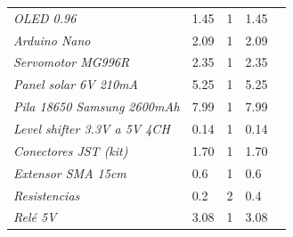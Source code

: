 \documentclass[12pt]{article}
\begin{document}
\begin{table}[h!]
\begin{tabular}{l|l|l|l|l}
			\multicolumn{1}{|l|}{\textit{OLED 0.96}}                        & 1.45                                                 & 1                                      & 1.45                                            &  \\ \cline{1-4}
			\multicolumn{1}{|l|}{\textit{Arduino Nano}}                     & 2.09                                                 & 1                                      & 2.09                                            &  \\ \cline{1-4}
			\multicolumn{1}{|l|}{\textit{Servomotor MG996R}}                & 2.35                                                 & 1                                      & 2.35                                            &  \\ \cline{1-4}
			\multicolumn{1}{|l|}{\textit{Panel solar 6V 210mA}}             & 5.25                                                 & 1                                      & 5.25                                            &  \\ \cline{1-4}
			\multicolumn{1}{|l|}{\textit{Pila 18650 Samsung 2600mAh}}       & 7.99                                                 & 1                                      & 7.99                                            &  \\ \cline{1-4}
			\multicolumn{1}{|l|}{\textit{Level shifter 3.3V a 5V 4CH}}      & 0.14                                                 & 1                                      & 0.14                                            &  \\ \cline{1-4}
			\multicolumn{1}{|l|}{\textit{Conectores JST (kit)}}             & 1.70                                                 & 1                                      & 1.70                                            &  \\ \cline{1-4}
			\multicolumn{1}{|l|}{\textit{Extensor SMA 15cm}}                & 0.6                                                  & 1                                      & 0.6                                             &  \\ \cline{1-4}
			\multicolumn{1}{|l|}{\textit{Resistencias}}                     & 0.2                                                  & 2                                      & 0.4                                             &  \\ \cline{1-4}
			\multicolumn{1}{|l|}{\textit{Relé 5V}}                          & 3.08                                                 & 1                                      & 3.08                                            &  \\ \cline{1-4}

\end{tabular}
\end{table}
\end{document}
